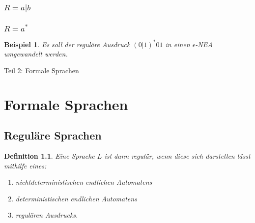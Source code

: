 \documentclass[12pt, oneside]{book}
\newtheorem{bsp}{Beispiel}
\newtheorem{definition}{Definition}
\begin{document}
\subsection[Regulärer Ausdruck: Alternative]{$R = a|b$}
\begin{figure}[H]
    \centering
    \begin{transitiongraph}[fa]
    \end{transitiongraph}
\end{figure}
\subsection[Regulärer Ausdruck: N-malige Wiederholung]{$R = a^*$}
\begin{figure}[H]
    \centering
    \begin{transitiongraph}[fa]
    \end{transitiongraph}
\end{figure}
\begin{bsp}
    Es soll der reguläre Ausdruck $(0|1)^*01$ in einen $\epsilon$-NEA umgewandelt werden.
\end{bsp}
\begin{titlepage}\centering
    \vspace*{\fill}
    \LARGE Teil 2: Formale Sprachen
    \vspace*{\fill}
\end{titlepage}
\chapter{Formale Sprachen}
\section{Reguläre Sprachen}
\begin{definition}
    Eine Sprache $L$ ist dann regulär, wenn diese sich darstellen lässt mithilfe eines:
    \begin{enumerate}
        \item nichtdeterministischen endlichen Automatens
        \item deterministischen endlichen Automatens
        \item regulären Ausdrucks.
    \end{enumerate}
\end{definition}
\end{document}
